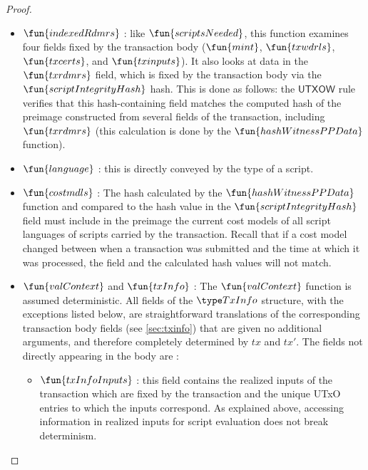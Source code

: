 \begin{property}
\begin{proof}
\begin{itemize}
      \item $\fun{indexedRdmrs}$ : like $\fun{scriptsNeeded}$, this function
      examines four fields fixed by the transaction body ($\fun{mint}$, $\fun{txwdrls}$,
      $\fun{txcerts}$, and $\fun{txinputs}$).
      It also looks at data in the $\fun{txrdmrs}$ field, which is fixed
      by the transaction body via the $\fun{scriptIntegrityHash}$
      hash. This is done as follows: the $\mathsf{UTXOW}$ rule verifies that this
      hash-containing field matches the computed hash
      of the preimage constructed from several fields of the transaction,
      including $\fun{txrdmrs}$ (this calculation
      is done by the $\fun{hashWitnessPPData}$ function).

      \item $\fun{language}$ : this is directly conveyed by the type of a script.

      \item $\fun{costmdls}$ : The hash calculated by the $\fun{hashWitnessPPData}$
      function and compared to the hash value in the $\fun{scriptIntegrityHash}$ field
      must include in the preimage the current cost models of
      all script languages of scripts carried by the transaction. Recall that
      if a cost model changed between when a transaction was submitted and the
      time at which it was processed, the field and the calculated hash values
      will not match.

      \item $\fun{valContext}$ and $\fun{txInfo}$ :
      The $\fun{valContext}$ function is assumed deterministic.
      All fields of the $\TxInfo$
      structure, with the exceptions listed below,
      are straightforward translations of the corresponding transaction body fields (see \ref{sec:txinfo}) that
      are given no additional arguments,
      and therefore completely determined by $tx$ and $tx'$. The fields not directly
      appearing in the body are :

      \begin{itemize}
        \item $\fun{txInfoInputs}$ : this field contains the realized inputs of
        the transaction which are fixed by the transaction and the unique
        UTxO entries to which the inputs correspond. As explained above,
        accessing information in realized inputs for script evaluation
        does not break determinism.


\end{itemize}
\end{itemize}
\end{proof}
\end{property}
